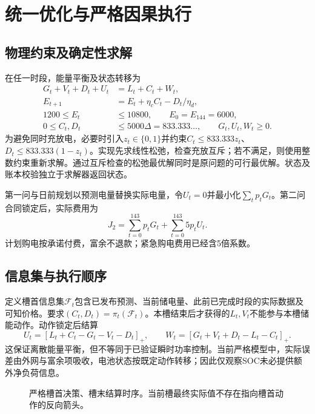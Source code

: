 \documentclass[UTF8,a4paper,zihao=-4,fontset=fandol]{ctexart}
\begin{document}
\section{统一优化与严格因果执行}
\subsection{物理约束及确定性求解}
在任一时段，能量平衡及状态转移为
\begin{align}
G_t+V_t+D_t+U_t &= L_t+C_t+W_t,\\
E_{t+1}&=E_t+\eta_c C_t-D_t/\eta_d,\\
1200\le E_t&\le10800,\qquad E_0=E_{144}=6000,\\
0\le C_t,D_t&\le5000\Delta=833.333\ldots,\qquad G_t,U_t,W_t\ge0.
\end{align}
为避免同时充放电，必要时引入$z_t\in\{0,1\}$并约束$C_t\le833.333z_t$、$D_t\le833.333(1-z_t)$。实现先求线性松弛，检查充放互斥；若不满足，则使用整数约束重新求解。通过互斥检查的松弛最优解同时是原问题的可行最优解。状态及账本校验独立于求解器返回状态。

第一问与日前规划以预测电量替换实际电量，令$U_t=0$并最小化$\sum_t p_tG_t$。第二问合同锁定后，实际费用为
\begin{equation}\label{eq:cost}
J_2=\sum_{t=0}^{143}p_tG_t+\sum_{t=0}^{143}5p_tU_t.
\end{equation}
计划购电按承诺付费，富余不退款；紧急购电费用已经含5倍系数。

\subsection{信息集与执行顺序}
定义槽首信息集$\mathcal F_t$包含已发布预测、当前储电量、此前已完成时段的实际数据及可知价格。要求$(C_t,D_t)=\pi_t(\mathcal F_t)$。本槽结束后才获得的$L_t,V_t$不能参与本槽储能动作。动作锁定后结算
\begin{equation}
U_t=[L_t+C_t-G_t-V_t-D_t]_+,\qquad
W_t=[G_t+V_t+D_t-L_t-C_t]_+.
\end{equation}
这保证离散能量平衡，但不等同于已验证瞬时功率控制。当前严格模型中，实际误差由外网与富余项吸收，电池状态按既定动作转移；因此仅观察SOC未必提供额外净负荷信息。
\begin{figure}[H]\centering
{}
\caption{严格槽首决策、槽末结算时序。当前槽最终实际值不存在指向槽首动作的反向箭头。}
\end{figure}
\end{document}
